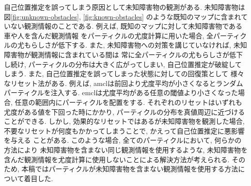 自己位置推定を誤ってしまう原因として未知障害物の観測がある. 
未知障害物は図\ref{fig:unknown-obstacles}, \ref{fig:known-obstacles}
のような既知のマップに含まれていない観測情報のことである. 
例えば, 既知のマップに対して未知障害物である車や人を含んだ観測情報
をパーティクルの尤度計算に用いた場合, 全パーティクルの尤もらしさが低下する. 
また, 未知障害物への対策を講じていなければ, 未知障害物が観測情報に含まれている間は
常に全パーティクルの尤もらしさが低下し続け, パーティクルの分布は大きく広がってしまい, 
自己位置推定が破綻してしまう. また, 自己位置推定を誤ってしまった状態に対しての回復策として
様々なリセット法がある. 
例えば, amclは前回より尤度平均が小さくなるとランダムパーティクルを注入する. 
emclは尤度平均がある任意の閾値より小さくなった場合, 
任意の範囲内にパーティクルを配置をする\cite{ueda2004iros}. 
それぞれのリセットはいずれも尤度がある値を下回った時にかかり, 
パーティクルの分布を真値周辺に近づけることができる. 
しかし, 効果的なリセットではあるが未知障害物を観測した場合, 
不要なリセットが何度もかかってしまうことで, かえって自己位置推定に悪影響を与える
ことがある. 
このような場合, 全てのパーティクルにおいて, 何らかの方法により
未知障害物を含まない同じ観測情報を使用するような, 
未知障害物を含んだ観測情報を尤度計算に使用しないことによる解決方法が考えられる. 
そのため, 本稿ではパーティクルが未知障害物を含まない観測情報を使用する方法について着目した. 

